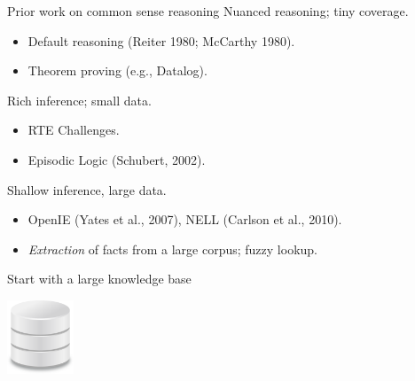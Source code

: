 \begin{frame}{Prior work on common sense reasoning}
 Nuanced reasoning; tiny coverage.
\begin{itemize}
  \item Default reasoning (Reiter 1980; McCarthy 1980).
  \item Theorem proving (e.g., Datalog).
\end{itemize}
\vspace{0.5cm}
\pause

 Rich inference; small data.
\begin{itemize}
  \item RTE Challenges.
  \item Episodic Logic (Schubert, 2002).
\end{itemize}
\vspace{0.5cm}
\pause

 Shallow inference, large data.
\begin{itemize}
  \item OpenIE (Yates et al., 2007), NELL (Carlson et al., 2010).
  \item \textit{Extraction} of facts from a large corpus; fuzzy lookup.
\end{itemize}
\end{frame}


\begin{frame}{Start with a large knowledge base}
\begin{center}
  \hspace{0.8cm}
  \includegraphics[height=2.2cm]{../img/database.png}
\end{center}
\end{frame}

